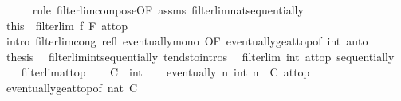 \begin{isabellebody}
\ \ \ \ \isamarkupfalse%
\ {\isacharparenleft}{\kern0pt}rule\ filterlim{\isacharunderscore}{\kern0pt}compose{\isacharbrackleft}{\kern0pt}OF\ assms\ filterlim{\isacharunderscore}{\kern0pt}nat{\isacharunderscore}{\kern0pt}sequentially{\isacharbrackright}{\kern0pt}{\isacharparenright}{\kern0pt}\isanewline
\ \ \isamarkupfalse%
\ \isamarkupfalse%
\ {\isachardoublequoteopen}{\isacharquery}{\kern0pt}this\ {\isasymlongleftrightarrow}\ filterlim\ f\ F\ at{\isacharunderscore}{\kern0pt}top{\isachardoublequoteclose}\isanewline
\ \ \ \ \isamarkupfalse%
\ {\isacharparenleft}{\kern0pt}intro\ filterlim{\isacharunderscore}{\kern0pt}cong\ refl\ eventually{\isacharunderscore}{\kern0pt}mono\ {\isacharbrackleft}{\kern0pt}OF\ eventually{\isacharunderscore}{\kern0pt}ge{\isacharunderscore}{\kern0pt}at{\isacharunderscore}{\kern0pt}top{\isacharbrackleft}{\kern0pt}of\ {\isachardoublequoteopen}{}{\isacharcolon}{\kern0pt}{\isacharcolon}{\kern0pt}int{\isachardoublequoteclose}{\isacharbrackright}{\kern0pt}{\isacharbrackright}{\kern0pt}{\isacharparenright}{\kern0pt}\ auto\isanewline
\ \ \isamarkupfalse%
\ \isamarkupfalse%
\ {\isacharquery}{\kern0pt}thesis\ \isacommand{{\isachardot}{\kern0pt}}\isamarkupfalse%
\isanewline
{}\isamarkupfalse%
%
\endisatagproof
{\isafoldproof}%
%
\isadelimproof
\isanewline
%
\endisadelimproof
\isanewline
{}\isamarkupfalse%
\ filterlim{\isacharunderscore}{\kern0pt}int{\isacharunderscore}{\kern0pt}sequentially\ {\isacharbrackleft}{\kern0pt}tendsto{\isacharunderscore}{\kern0pt}intros{\isacharbrackright}{\kern0pt}{\isacharcolon}{\kern0pt}\isanewline
\ \ {\isachardoublequoteopen}filterlim\ int\ at{\isacharunderscore}{\kern0pt}top\ sequentially{\isachardoublequoteclose}\isanewline
%
\isadelimproof
\ \ %
\endisadelimproof
%
\isatagproof
{}\isamarkupfalse%
\ filterlim{\isacharunderscore}{\kern0pt}at{\isacharunderscore}{\kern0pt}top\isanewline
{}\isamarkupfalse%
\isanewline
\ \ \isamarkupfalse%
\ C\ {\isacharcolon}{\kern0pt}{\isacharcolon}{\kern0pt}\ int\isanewline
\ \ \isamarkupfalse%
\ {\isachardoublequoteopen}eventually\ {\isacharparenleft}{\kern0pt}{\isasymlambda}n{\isachardot}{\kern0pt}\ int\ n\ {\isasymge}\ C{\isacharparenright}{\kern0pt}\ at{\isacharunderscore}{\kern0pt}top{\isachardoublequoteclose}\isanewline
\ \ \ \ \isamarkupfalse%
\ eventually{\isacharunderscore}{\kern0pt}ge{\isacharunderscore}{\kern0pt}at{\isacharunderscore}{\kern0pt}top{\isacharbrackleft}{\kern0pt}of\ {\isachardoublequoteopen}nat\ {\isasymlceil}C{\isasymrceil}{\isachardoublequoteclose}{\isacharbrackright}{\kern0pt}\ \isamarkupfalse%

\end{isabellebody}
